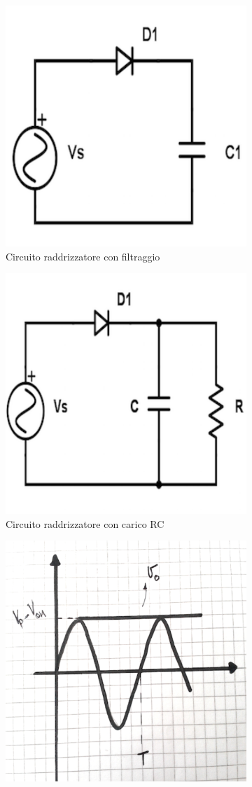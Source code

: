 \documentclass[a4paper,portrait,12pt]{article}
\theoremstyle{definition}
\begin{document}
\begin{figure}[H]
\begin{subfigure}{.5\textwidth}
\centering
\includegraphics[width=.5\linewidth]{img/raddcap.pdf}
\caption{Circuito raddrizzatore con filtraggio}
\label{fig:integratore}
\end{subfigure}
\begin{subfigure}{.5\textwidth}
\centering
\includegraphics[width=.5\linewidth]{img/raddRC.pdf}
\caption{Circuito raddrizzatore con carico RC}
\label{fig:derivatore}
\end{subfigure}
\begin{subfigure}{.5\textwidth}
\centering
\includegraphics[width=.5\linewidth]{img/uscitaraddcap.pdf}

\end{subfigure}
\end{figure}
\end{document}

